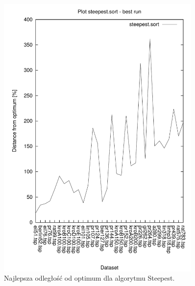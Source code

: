 \begin{figure}
\begin{center}
\includegraphics[width=0.9\textwidth]{wykresy/steepest_sort_best}
\end{center}
\caption{Najlepsza odległość od optimum dla algorytmu Steepest.}
\label{steepest_sort_best}
\end{figure}


